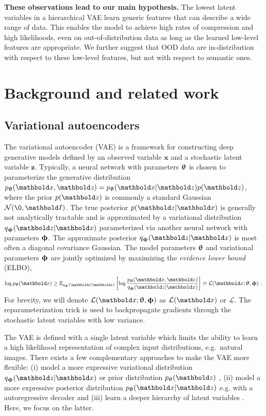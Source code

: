 {\textbf{These observations lead to our main hypothesis.}
The lowest latent variables in a hierarchical VAE learn generic features that can describe a wide range of data.
This enables the model to achieve high rates of compression and high likelihoods, even on out-of-distribution data as long as the learned low-level features are appropriate.
We further suggest that OOD data are in-distribution with respect to these low-level features, but not with respect to semantic ones.

\vspace{0cm}
\section{Background and related work}

\subsection{Variational autoencoders}
The variational autoencoder (VAE) \parencite{kingma_autoencoding_2014, rezende_stochastic_2014} is a framework for constructing deep generative models defined by an observed variable $\mathbf{x}$ and a stochastic latent variable $\mathbf{z}$.
Typically, a neural network with parameters ${\boldsymbol{\uptheta}}$ is chosen to parameterize the generative distribution $p_\thetab(\xb,\zb)=p_\thetab(\xb|\zb)p(\zb)$, where the prior $p(\zb)$ is commonly a standard Gaussian $\mathcal{N}(\0, \Ib)$.
The true posterior $p(\zb|\xb)$ is generally not analytically tractable and is approximated by a variational distribution $q_\phib(\zb|\xb)$ parameterized via another neural network with parameters ${\boldsymbol{\upphi}}$. The approximate posterior $q_\phib(\zb|\xb)$ is most often  a diagonal covariance Gaussian.
The model parameters ${\boldsymbol{\uptheta}}$ and variational parameters ${\boldsymbol{\upphi}}$ are jointly optimized by maximizing the \textit{evidence lower bound} (ELBO),
\begin{equation}\label{eq_hierarchical:elbo}
    \log p_\thetab(\xb) \geq \mathbb{E}_{q_\phib(\zb|\xb)} \left[ \log \frac{p_\thetab(\xb,\zb)}{q_\phib(\zb|\xb)} \right] \equiv \mathcal{L}(\xb; \thetab, \phib)\ .
\end{equation}
For brevity, we will denote $\mathcal{L}(\xb; \thetab, \phib)$ as $\mathcal{L}(\xb)$ or $\mathcal{L}$. The reparameterization trick is used to backpropagate gradients through the stochastic latent variables with low variance.

The VAE is defined with a single latent variable which limits the ability to learn a high likelihood representation of complex input distributions, e.g.\ natural images.
There exists a few complementary approaches to make the VAE more flexible: (i) model a more expressive variational distribution $q_\phib(\zb|\xb)$ or prior distribution $p_\thetab(\zb)$ \parencite{rezende_variational_2015, kingma_improved_2016}, (ii) model a more expressive posterior distribution $p_\thetab(\xb|\zb)$ e.g. with a autoregressive decoder \parencite{oord_conditional_2016} and (iii) learn a deeper hierarchy of latent variables \parencite{burda_importance_2016, sonderby_ladder_2016}.
Here, we focus on the latter.


}
